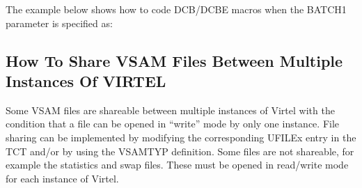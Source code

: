 \documentclass[letterpaper,10pt,english]{sphinxmanual}
\begin{document}
\sphinxAtStartPar
The example below shows how to code DCB/DCBE macros when the BATCH1 parameter is specified as:

\begin{sphinxVerbatim}[commandchars=\\\{\}]

                             
                                                    
                                                       
                                                       
                                                       
         
                               
                                                    
                                                      
                                                       
                                                      
        
\end{sphinxVerbatim}

\ignorespaces 

\subsection{How To Share VSAM Files Between Multiple Instances Of VIRTEL}
\label{\detokenize{Installation_Guide:how-to-share-vsam-files-between-multiple-instances-of-virtel}}\label{\detokenize{Installation_Guide:index-147}}
\sphinxAtStartPar
Some VSAM files are shareable between multiple instances of Virtel with the condition that a file can be opened in “write” mode by only one instance. File sharing can be implemented by modifying the corresponding UFILEx entry in the TCT and/or by using the VSAMTYP definition. Some files are not shareable, for example the statistics and swap files. These must be opened in read/write mode for each instance of Virtel.
\end{document}
